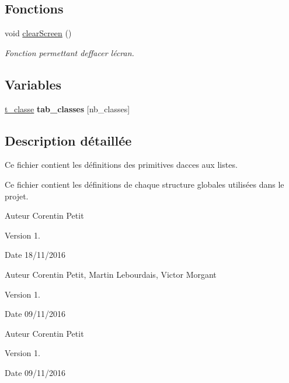 \subsection*{Fonctions}
\begin{DoxyCompactItemize}
\item 
void \hyperlink{a00020_a3eed6cf0481bf3462f6c5169e1b257f7}{clear\+Screen} ()\hypertarget{a00020_a3eed6cf0481bf3462f6c5169e1b257f7}{}\label{a00020_a3eed6cf0481bf3462f6c5169e1b257f7}

\begin{DoxyCompactList}\small\item\em Fonction permettant d\textquotesingle{}effacer l\textquotesingle{}écran. \end{DoxyCompactList}\end{DoxyCompactItemize}
\subsection*{Variables}
\begin{DoxyCompactItemize}
\item 
\hyperlink{a00003}{t\+\_\+classe} {\bfseries tab\+\_\+classes} \mbox{[}nb\+\_\+classes\mbox{]}\hypertarget{a00020_a61d1d67ae5f5040aa12b0bcc9d0e39f8}{}\label{a00020_a61d1d67ae5f5040aa12b0bcc9d0e39f8}

\end{DoxyCompactItemize}


\subsection{Description détaillée}
Ce fichier contient les définitions des primitives d\textquotesingle{}acces aux listes. 

Ce fichier contient les définitions de chaque structure globales utilisées dans le projet.

\begin{DoxyAuthor}{Auteur}
Corentin Petit 
\end{DoxyAuthor}
\begin{DoxyVersion}{Version}
1. 
\end{DoxyVersion}
\begin{DoxyDate}{Date}
18/11/2016
\end{DoxyDate}
\begin{DoxyAuthor}{Auteur}
Corentin Petit, Martin Lebourdais, Victor Morgant 
\end{DoxyAuthor}
\begin{DoxyVersion}{Version}
1. 
\end{DoxyVersion}
\begin{DoxyDate}{Date}
09/11/2016
\end{DoxyDate}
\begin{DoxyAuthor}{Auteur}
Corentin Petit 
\end{DoxyAuthor}
\begin{DoxyVersion}{Version}
1. 
\end{DoxyVersion}
\begin{DoxyDate}{Date}
09/11/2016 
\end{DoxyDate}
